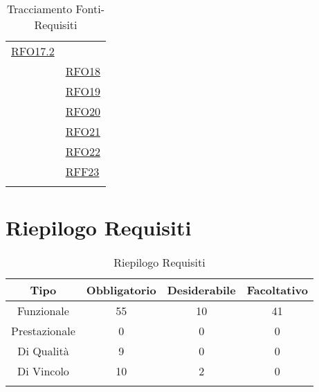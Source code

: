 \begin{longtable}{|>{\centering}m{5cm}|m{5cm}<{\centering}|}
	\hyperlink{RFO17.2}{RFO17.2}\\ & \hyperlink{RFO18}{RFO18}\\ & \hyperlink{RFO19}{RFO19}\\ & \hyperlink{RFO20}{RFO20}\\ & \hyperlink{RFO21}{RFO21}\\ & \hyperlink{RFO22}{RFO22}\\ & \hyperlink{RFF23}{RFF23}\\ \hline
	\caption[Tracciamento Fonti-Requisiti]{Tracciamento Fonti-Requisiti}
	\label{tabella:fonti-requi}
\end{longtable}
\clearpage

\section{Riepilogo Requisiti}
\normalsize
\begin{longtable}{|c|c|c|c|}
	\hline 
	\textbf{Tipo} & \textbf{Obbligatorio} & \textbf{Desiderabile} & \textbf{Facoltativo}\\
	\hline
	Funzionale & 55 & 10 & 41\\ \hline
	Prestazionale & 0 & 0 & 0\\ \hline
	Di Qualità & 9 & 0 & 0\\ \hline
	Di Vincolo & 10 & 2 & 0\\ \hline
	\caption[Riepilogo Requisiti]{Riepilogo Requisiti}
	\label{tabella:riepilogorequi}
\end{longtable}
\clearpage


